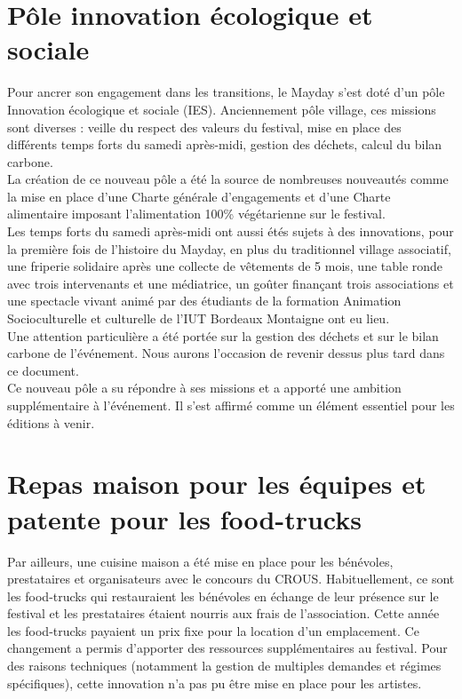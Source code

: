 \documentclass[12pt,a4paper]{report}
\begin{document}
\section{Pôle innovation écologique et sociale}
Pour ancrer son engagement dans les transitions, le Mayday s’est doté d’un pôle Innovation écologique et sociale (IES). Anciennement pôle village, ces missions sont diverses : veille du respect des valeurs du festival, mise en place des différents temps forts du samedi après-midi, gestion des déchets, calcul du bilan carbone.\\

La création de ce nouveau pôle a été la source de nombreuses nouveautés comme la mise en place d’une Charte générale d’engagements et d’une Charte alimentaire imposant l'alimentation 100\% végétarienne sur le festival.\\

Les temps forts du samedi après-midi ont aussi étés sujets à des innovations, pour la première fois de l’histoire du Mayday, en plus du traditionnel village associatif, une friperie solidaire après une collecte de vêtements de 5 mois, une table ronde avec trois intervenants et une médiatrice, un goûter finançant trois associations et une spectacle vivant animé par des étudiants de la formation Animation Socioculturelle et culturelle de l’IUT Bordeaux Montaigne ont eu lieu.\\

Une attention particulière a été portée sur la gestion des déchets et sur le bilan carbone de l’événement. Nous aurons l’occasion de revenir dessus plus tard dans ce document.\\

Ce nouveau pôle a su répondre à ses missions et a apporté une ambition supplémentaire à l'événement. Il s'est affirmé comme un élément essentiel pour les éditions à venir.

\section{Repas maison pour les équipes et patente pour les food-trucks}
Par ailleurs, une cuisine maison a été mise en place pour les bénévoles, prestataires et organisateurs avec le concours du CROUS. Habituellement, ce sont les food-trucks qui restauraient les bénévoles en échange de leur présence sur le festival et les prestataires étaient nourris aux frais de l’association. Cette année les food-trucks payaient un prix fixe pour la location d'un emplacement. Ce changement a permis d’apporter des ressources supplémentaires au festival. Pour des raisons techniques (notamment la gestion de multiples demandes et régimes spécifiques), cette innovation n'a pas pu être mise en place pour les artistes.\\
\end{document}
